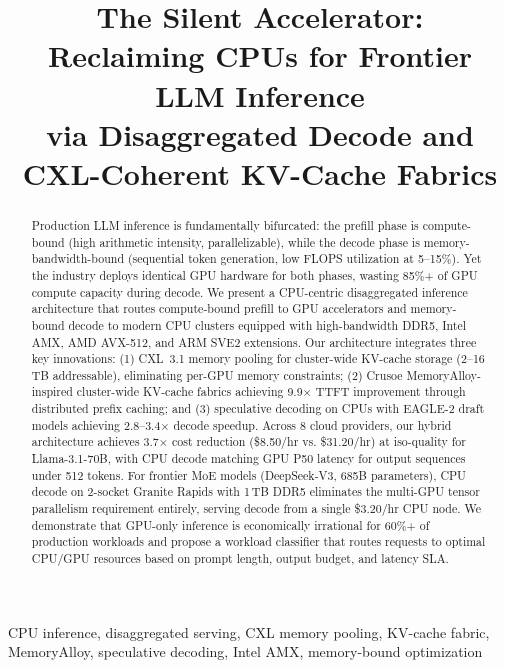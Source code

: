 \documentclass[conference,10pt]{IEEEtran}
\begin{document}
\title{The Silent Accelerator:\\Reclaiming CPUs for Frontier LLM Inference\\via Disaggregated Decode and CXL-Coherent KV-Cache Fabrics}
\author{
}
\maketitle

\begin{abstract}
Production LLM inference is fundamentally bifurcated: the prefill phase is compute-bound (high arithmetic intensity, parallelizable), while the decode phase is memory-bandwidth-bound (sequential token generation, low FLOPS utilization at 5--15\%). Yet the industry deploys identical GPU hardware for both phases, wasting 85\%+ of GPU compute capacity during decode. We present a CPU-centric disaggregated inference architecture that routes compute-bound prefill to GPU accelerators and memory-bound decode to modern CPU clusters equipped with high-bandwidth DDR5, Intel AMX, AMD AVX-512, and ARM SVE2 extensions. Our architecture integrates three key innovations: (1) CXL~3.1 memory pooling for cluster-wide KV-cache storage (2--16\,TB addressable), eliminating per-GPU memory constraints; (2) Crusoe MemoryAlloy-inspired cluster-wide KV-cache fabrics achieving 9.9$\times$ TTFT improvement through distributed prefix caching; and (3) speculative decoding on CPUs with EAGLE-2 draft models achieving 2.8--3.4$\times$ decode speedup. Across 8 cloud providers, our hybrid architecture achieves 3.7$\times$ cost reduction (\$8.50/hr vs. \$31.20/hr) at iso-quality for Llama-3.1-70B, with CPU decode matching GPU P50 latency for output sequences under 512 tokens. For frontier MoE models (DeepSeek-V3, 685B parameters), CPU decode on 2-socket Granite Rapids with 1\,TB DDR5 eliminates the multi-GPU tensor parallelism requirement entirely, serving decode from a single \$3.20/hr CPU node. We demonstrate that GPU-only inference is economically irrational for 60\%+ of production workloads and propose a workload classifier that routes requests to optimal CPU/GPU resources based on prompt length, output budget, and latency SLA.
\end{abstract}
\begin{IEEEkeywords}
CPU inference, disaggregated serving, CXL memory pooling, KV-cache fabric, MemoryAlloy, speculative decoding, Intel AMX, memory-bound optimization
\end{IEEEkeywords}
\end{document}
